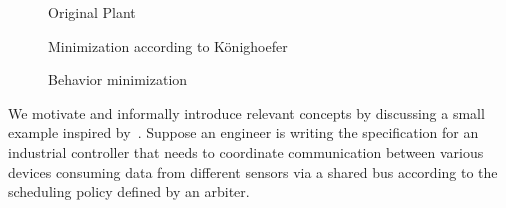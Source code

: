 \begin{figure}[bt]
\centering
\SmallPicture
{}
\caption{Original Plant}
\label{fig:konig_original_plant}
\MediumPicture
\end{figure}
\begin{figure}[bt]
	\centering
	\SmallPicture
	\caption{Minimization according to Könighoefer}
	\label{fig:konig_original_plant_k}
	\MediumPicture
\end{figure}
\begin{figure}[bt]
	\centering
	\SmallPicture
	\caption{Behavior minimization}
	\label{fig:konig_original_plant_c}
	\MediumPicture
\end{figure}
\clearpage
We motivate and informally introduce relevant concepts by discussing a small example inspired by~\cite{DBLP:conf/vmcai/PitermanPS06}. Suppose an engineer is writing the specification for an industrial
controller that needs to coordinate communication between various devices consuming data from different sensors via a shared bus according to the scheduling policy defined by an arbiter. 
